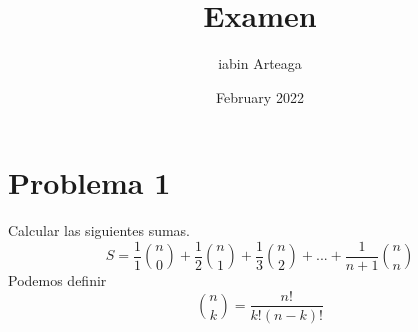 \documentclass{article}
\title{Examen}
\author{iabin Arteaga}
\date{February 2022}
\begin{document}
\maketitle

\section{Problema 1}
Calcular las siguientes sumas.
\[
    S =\frac{1}{1} \binom{n}{0} + \frac{1}{2} \binom{n}{1} + \frac{1}{3} \binom{n}{2} + ... +\frac{1}{n+1} \binom{n}{n}
\]
\newline
Podemos definir \[ \binom{n}{k} = \frac{n!}{k!(n-k)!}\]
\end{document}
